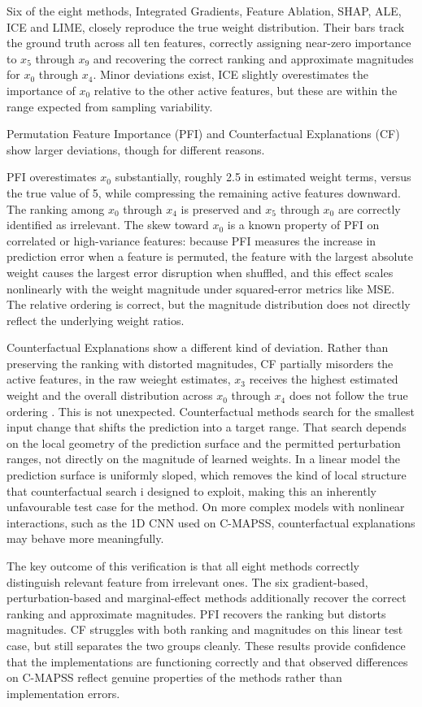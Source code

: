Six of the eight methods, Integrated Gradients, Feature Ablation, SHAP, ALE, ICE and LIME, closely reproduce the true weight distribution. Their bars track the ground truth across all ten features, correctly assigning near-zero importance to $x_5$ through $x_9$ and recovering the correct ranking and approximate magnitudes for $x_0$ through $x_4$. Minor deviations exist, ICE slightly overestimates the importance of $x_0$ relative to the other active features, but these are within the range expected from sampling variability.

Permutation Feature Importance (PFI) and Counterfactual Explanations (CF) show larger deviations, though for different reasons.

PFI overestimates $x_0$ substantially, roughly 2.5 in estimated weight terms, versus the true value of 5, while compressing the remaining active features downward. The ranking among $x_0$ through $x_4$ is preserved and $x_5$ through $x_0$ are correctly identified as irrelevant. The skew toward $x_0$ is a known property of PFI on correlated or high-variance features: because PFI measures the increase in prediction error when a feature is permuted, the feature with the largest absolute weight causes the largest error disruption when shuffled, and this effect scales nonlinearly with the weight magnitude under squared-error metrics like MSE. The relative ordering is correct, but the magnitude distribution does not directly reflect the underlying weight ratios.

Counterfactual Explanations show a different kind of deviation. Rather than preserving the ranking with distorted magnitudes, CF partially misorders the active features, in the raw weieght estimates, $x_3$ receives the highest estimated weight and the overall distribution across $x_0$ through $x_4$ does not follow the true ordering . This is not unexpected. Counterfactual methods search for the smallest input change that shifts the prediction into a target range. That search depends on the local geometry of the prediction surface and the permitted perturbation ranges, not directly on the magnitude of learned weights. In a linear model the prediction surface is uniformly sloped, which removes the kind of local structure that counterfactual search i designed to exploit, making this an inherently unfavourable test case for the method. On more complex models with nonlinear interactions, such as the 1D CNN used on C-MAPSS, counterfactual explanations may behave more meaningfully.

The key outcome of this verification is that all eight methods correctly distinguish relevant feature from irrelevant ones. The six gradient-based, perturbation-based and marginal-effect methods additionally recover the correct ranking and approximate magnitudes. PFI recovers the ranking but distorts magnitudes. CF struggles with both ranking and magnitudes on this linear test case, but still separates the two groups cleanly. These results provide confidence that the implementations are functioning correctly and that observed differences on C-MAPSS reflect genuine properties of the methods rather than implementation errors.

